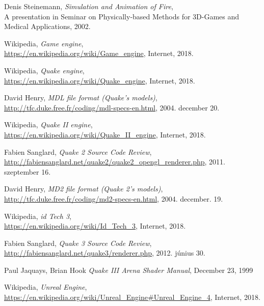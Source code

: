 \begin{thebibliography}{x}

  Denis Steinemann,
  \textit{Simulation and Animation of Fire}, \\
  A presentation in Seminar on Physically-based Methods for 3D-Games and Medical Applications, 2002.

  Wikipedia,
  \textit{Game engine}, \\
  \url{https://en.wikipedia.org/wiki/Game_engine}, Internet, 2018.

 Wikipedia, 
 \textit{Quake engine},\\
 \url{https://en.wikipedia.org/wiki/Quake_engine}, Internet, 2018.
  
 David Henry, 
 \textit{MDL file format (Quake's models)},\\
 \url{http://tfc.duke.free.fr/coding/mdl-specs-en.html}, 2004. december 20.
 
 Wikipedia, 
 \textit{Quake II engine},\\
 \url{https://en.wikipedia.org/wiki/Quake_II_engine}, Internet, 2018.

 Fabien Sanglard, 
 \textit{Quake 2 Source Code Review},\\
 \url{http://fabiensanglard.net/quake2/quake2_opengl_renderer.php}, 2011. szeptember 16.
 
 David Henry, 
 \textit{MD2 file format (Quake 2's models)},\\
 \url{http://tfc.duke.free.fr/coding/md2-specs-en.html}, 2004. december. 19.

 Wikipedia, 
 \textit{id Tech 3},\\
 \url{https://en.wikipedia.org/wiki/Id_Tech_3}, Internet, 2018.
 
  Fabien Sanglard, 
  \textit{Quake 3 Source Code Review},\\
  \url{http://fabiensanglard.net/quake3/renderer.php}, 2012. június 30.

  Paul Jaquays, Brian Hook
  \textit{Quake III Arena Shader Manual},
  December 23, 1999

 Wikipedia, 
 \textit{Unreal Engine},\\
 \url{https://en.wikipedia.org/wiki/Unreal_Engine#Unreal_Engine_4}, Internet, 2018.


\end{thebibliography}
